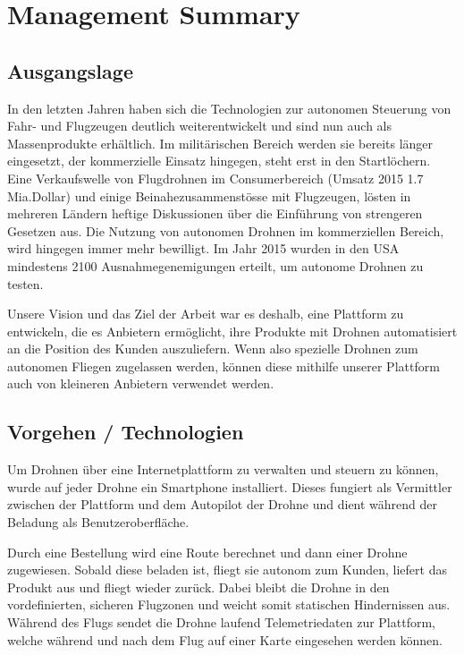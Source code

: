 \newpage
{}
\chapter{Management Summary}
\section*{Ausgangslage}
In den letzten Jahren haben sich die Technologien zur autonomen Steuerung von Fahr- und Flugzeugen deutlich weiterentwickelt und sind nun auch als Massenprodukte erhältlich. Im militärischen Bereich werden sie bereits länger eingesetzt, der kommerzielle Einsatz hingegen, steht erst in den Startlöchern. Eine Verkaufswelle von Flugdrohnen im Consumerbereich (Umsatz 2015 1.7 Mia.Dollar) \cite{droneNZZ} und einige Beinahezusammenstösse mit Flugzeugen, lösten in mehreren Ländern heftige Diskussionen über die Einführung von strengeren Gesetzen aus. Die Nutzung von autonomen Drohnen im kommerziellen Bereich, wird hingegen immer mehr bewilligt. Im Jahr 2015 wurden in den USA mindestens 2100 \cite{perm} Ausnahmegenemigungen erteilt, um autonome Drohnen zu testen.

Unsere Vision und das Ziel der Arbeit war es deshalb, eine Plattform zu entwickeln, die es Anbietern ermöglicht, ihre Produkte mit Drohnen automatisiert an die Position des Kunden auszuliefern. Wenn also spezielle Drohnen zum autonomen Fliegen zugelassen werden, können diese mithilfe unserer Plattform auch von kleineren Anbietern verwendet werden.

\section*{Vorgehen / Technologien}

Um Drohnen über eine Internetplattform zu verwalten und steuern zu können, wurde auf jeder Drohne ein Smartphone installiert. Dieses fungiert als Vermittler zwischen der Plattform und dem Autopilot der Drohne und dient während der Beladung als Benutzeroberfläche.

Durch eine Bestellung wird eine Route berechnet und dann einer Drohne zugewiesen. Sobald diese beladen ist, fliegt sie autonom zum Kunden, liefert das Produkt aus und fliegt wieder zurück. Dabei bleibt die Drohne in den vordefinierten, sicheren Flugzonen und weicht somit statischen Hindernissen aus. Während des Flugs sendet die Drohne laufend Telemetriedaten zur Plattform, welche während und nach dem Flug auf einer Karte eingesehen werden können.

